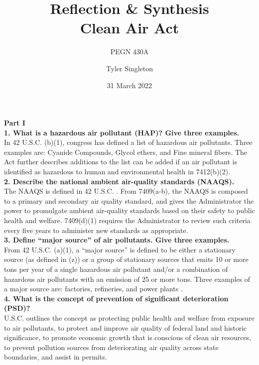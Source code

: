 \documentclass[12pt]{article}
\title{Reflection \& Synthesis \\
Clean Air Act}
\subtitle{PEGN 430A}
\author{Tyler Singleton}
\date{31 March 2022}
\begin{document}
\maketitle

\newpage
\setlength{\parindent}{0pt}

\textbf{Part I} \\

\textbf{1. What is a hazardous air pollutant (HAP)? Give three examples.} \\
In 42 U.S.C. (b)(1), congress has defined a list of hazardous air pollutants. Three examples are: Cyanide Compounds, Glycol ethers, and Fine mineral fibers. The Act further describes additions to the list can be added if an air pollutant is identified as hazardous to human and environmental health in 7412(b)(2). \\

\textbf{2. Describe the national ambient air-quality standards (NAAQS).} \\
The NAAQS is defined in 42 U.S.C. . From 7409(a-b), the NAAQS is composed to a primary and secondary air quality standard, and gives the Administrator the power to promulgate ambient air-quality standards based on their safety to public health and welfare. 7409(d)(1) requires the Administrator to review such criteria every five years to administer new standards as appropriate. \\

\textbf{3. Define ``major source'' of air pollutants.  Give three examples.} \\
From 42 U.S.C. (a)(1), a ``major source'' is defined to be either a stationary source (as defined in (z)) or a group of stationary sources that emits 10 or more tons per year of a single hazardous air pollutant and/or a combination of hazardous air pollutants with an emission of 25 or more tons. Three examples of a major source are: factories, refineries, and power plants \cite{epa}. \\

\textbf{4. What is the concept of prevention of significant deterioration (PSD)?} \\
U.S.C.  outlines the concept as protecting public health and welfare from exposure to air pollutants, to protect and improve air quality of federal land and historic significance, to promote economic growth that is conscious of clean air resources, to prevent pollution sources from deteriorating air quality across state boundaries, and assist in permits. \\
\end{document}
